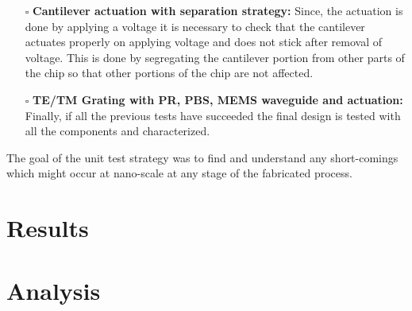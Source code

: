 \documentclass[../report.tex]{subfiles}
\begin{document}
\begin{itemize}[leftmargin=*]
		\item[$\square$] \textbf{Cantilever actuation with separation strategy:} Since, the actuation is done by applying a voltage it is necessary to check that the cantilever actuates properly on applying voltage and does not stick after removal of voltage. This is done by segregating the cantilever portion from other parts of the chip so that other portions of the chip are not affected. 
		
		\item[$\square$] \textbf{TE/TM Grating with PR, PBS, MEMS waveguide and actuation:} Finally, if all the previous tests have succeeded the final design is tested with all the components and characterized.
	\end{itemize}
	
	\noindent The goal of the unit test strategy was to find and understand any short-comings which might occur at nano-scale at any stage of the fabricated process.
	
	\section{Results}
	
	\section{Analysis}
	
\end{document}
